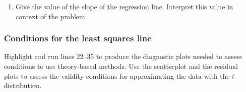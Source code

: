 \documentclass[
]{report}
\newenvironment{Shaded}{\begin{snugshade}}{\end{snugshade}}
\newcommand{\AttributeTok}[1]{\textcolor[rgb]{0.77,0.63,0.00}{#1}}
\newcommand{\CommentTok}[1]{\textcolor[rgb]{0.56,0.35,0.01}{\textit{#1}}}
\newcommand{\FunctionTok}[1]{\textcolor[rgb]{0.00,0.00,0.00}{#1}}
\newcommand{\NormalTok}[1]{#1}
\newcommand{\OtherTok}[1]{\textcolor[rgb]{0.56,0.35,0.01}{#1}}
\newcommand{\SpecialCharTok}[1]{\textcolor[rgb]{0.00,0.00,0.00}{#1}}
\providecommand{\tightlist}{%
  \setlength{\itemsep}{0pt}\setlength{\parskip}{0pt}}
\begin{document}
\begin{Shaded}
\end{Shaded}

\begin{enumerate}
\def\labelenumi{\arabic{enumi}.}
\setcounter{enumi}{3}
\tightlist
\item
  Give the value of the slope of the regression line. Interpret this value in context of the problem.
  \vspace{0.6in}
\end{enumerate}

\hypertarget{conditions-for-the-least-squares-line-1}{%
\subsubsection*{Conditions for the least squares line}\label{conditions-for-the-least-squares-line-1}}

Highlight and run lines 22--35 to produce the diagnostic plots needed to assess conditions to use theory-based methods. Use the scatterplot and the residual plots to assess the validity conditions for approximating the data with the \(t\)-distribution.
\end{document}
